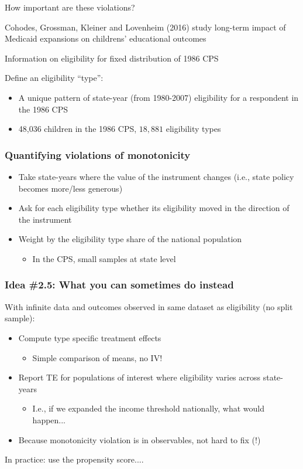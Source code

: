 \documentclass[notes,11pt, aspectratio=169]{beamer}
\newenvironment{wideitemize}{\itemize\addtolength{\itemsep}{10pt}}{\enditemize}
\begin{document}
\begin{frame}{How important are these violations?}
  \begin{wideitemize}
  \item Cohodes, Grossman, Kleiner and Lovenheim (2016) study long-term impact of Medicaid
    expansions on childrens' educational outcomes
  \item Information on eligibility for fixed distribution of 1986 CPS 
  \item Define an eligibility ``type'':
  	\begin{itemize}
	\item A unique pattern of state-year (from 1980-2007) eligibility for a respondent in the 1986 CPS 
	\item 48,036 children in the 1986 CPS, $18,881$ eligibility types 
	\end{itemize}
  \end{wideitemize}
\end{frame}


\begin{frame}
\frametitle{Quantifying violations of monotonicity}

\begin{itemize}
\item Take state-years where the value of the instrument changes (i.e., state policy becomes more/less generous)
\item Ask for each eligibility type whether its eligibility moved in the direction of the instrument
\item Weight by the eligibility type share of the national population
	\begin{itemize}
	\item In the CPS, small samples at state level
	\end{itemize}
\end{itemize}


\end{frame}


\begin{frame}
\frametitle{Idea \#2.5: What you can sometimes do instead}

With infinite data and outcomes observed in same dataset as eligibility (no split sample): 
	\begin{itemize}
	\item Compute type specific treatment effects 
		\begin{itemize}
		\item Simple comparison of means, no IV! 
		\end{itemize}
	\item Report TE for populations of interest where eligibility varies across state-years
		\begin{itemize}
		\item I.e., if we expanded the income threshold nationally, what would happen...
		\end{itemize} 
	\item Because monotonicity violation is in observables, not hard to fix (!)
	\end{itemize} 
In practice: use the propensity score....
\end{frame}
\end{document}

